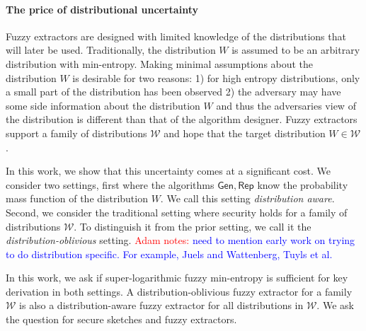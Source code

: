 \documentclass[11pt]{article}
\newcommand{\class}[1]{{\ensuremath{\mathsf{#1}}}}
\newcommand{\gen}{\ensuremath{\class{Gen}}\xspace}
\newcommand{\rep}{\ensuremath{\class{Rep}}\xspace}
\newcommand{\authnote}[2]{{\textcolor{red}{\textsf{#1 notes: }\textcolor{blue}{ #2}}\marginpar{\textcolor{red}{\textbf{!!!!!}}}}}
\newcommand{\authnote}[2]{}
\newcommand{\anote}[1]{{\authnote{Adam}{#1}}}
\begin{document}
\paragraph{The price of distributional uncertainty}
Fuzzy extractors are designed with limited knowledge of the distributions that will later be used.  Traditionally, the distribution $W$ is assumed to be an arbitrary distribution with min-entropy.  Making minimal assumptions about the distribution $W$ is desirable for two reasons: 1) for high entropy distributions, only a small part of the distribution has been observed 2) the adversary may have some side information about the distribution $W$ and thus the adversaries view of the distribution is different than that of the algorithm designer.  Fuzzy extractors support a family of distributions $\mathcal{W}$ and hope that the target distribution $W\in\mathcal{W}$.

In this work, we show that this uncertainty comes at a significant cost.  We consider two settings, first where the algorithms $\gen, \rep$ know the probability mass function of the distribution $W$.  We call this setting \emph{distribution aware}.  Second, we consider the traditional setting where security holds for a family of distributions $\mathcal{W}$.  To distinguish it from the prior setting, we call it the \emph{distribution-oblivious} setting.
\anote{need to mention early work on trying to do distribution specific. For example, Juels and Wattenberg, Tuyls et al.}


In this work, we ask if super-logarithmic fuzzy min-entropy is sufficient for key derivation in both settings.  A distribution-oblivious fuzzy extractor for a family $\mathcal{W}$ is also a distribution-aware fuzzy extractor for all distributions in $\mathcal{W}$.   We ask the question for secure sketches and fuzzy extractors.


\end{document}
